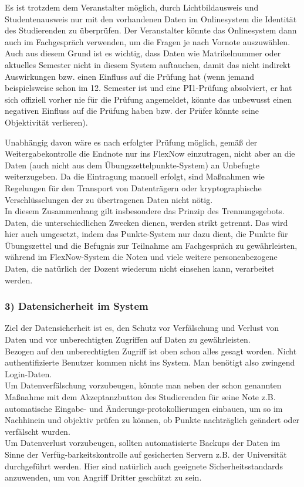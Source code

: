 \documentclass{swp1}
\begin{document}
Es ist trotzdem dem Veranstalter möglich, durch Lichtbildausweis und Studentenausweis nur mit den vorhandenen Daten im Onlinesystem die Identität des Studierenden zu überprüfen. Der Veranstalter könnte das Onlinesystem dann auch im Fachgespräch verwenden, um die Fragen je nach Vornote auszuwählen. Auch aus diesem Grund ist es wichtig, dass Daten wie Matrikelnummer oder aktuelles Semester nicht in diesem System auftauchen, damit das nicht indirekt Auswirkungen bzw. einen Einfluss auf die Prüfung hat (wenn jemand beispielsweise schon im 12. Semester ist und eine PI1-Prüfung absolviert, er hat sich offiziell vorher nie für die Prüfung angemeldet, könnte das unbewusst einen negativen Einfluss auf die Prüfung haben bzw. der Prüfer könnte seine Objektivität verlieren).

Unabhängig davon wäre es nach erfolgter Prüfung möglich, gemäß der Weitergabekontrolle die Endnote nur ins FlexNow einzutragen, nicht aber an die Daten (auch nicht aus dem Übungszettelpunkte-System) an Unbefugte weiterzugeben. Da die Eintragung manuell erfolgt, sind Maßnahmen wie Regelungen für den Transport von Datenträgern oder 
kryptographische Verschlüsselungen der zu übertragenen Daten nicht nötig. \\
In diesem Zusammenhang gilt insbesondere das Prinzip des Trennungsgebots. Daten, die unterschiedlichen Zwecken dienen, werden strikt getrennt. Das wird hier auch umgesetzt, indem das Punkte-System nur dazu dient, die Punkte für Übungszettel und die Befugnis zur Teilnahme am Fachgespräch zu gewährleisten, während im FlexNow-System die Noten und viele weitere personenbezogene Daten, die natürlich der Dozent wiederum nicht einsehen kann, verarbeitet werden.


\subsubsection*{3) Datensicherheit im System}

Ziel der Datensicherheit ist es, den Schutz vor Verfälschung und Verlust von Daten und vor unberechtigten Zugriffen auf Daten zu gewährleisten.\\
Bezogen auf den unberechtigten Zugriff ist oben schon alles gesagt worden. Nicht authentifizierte Benutzer kommen nicht ins System. Man benötigt also zwingend Login-Daten. \\
Um Datenverfälschung vorzubeugen, könnte man neben der schon genannten Maßnahme mit dem Akzeptanzbutton des Studierenden für seine Note z.B. automatische Eingabe- und Änderungs-protokollierungen einbauen, um so im Nachhinein und objektiv prüfen zu können, ob Punkte nachträglich geändert oder verfälscht wurden.\\
Um Datenverlust vorzubeugen, sollten automatisierte Backups der Daten im Sinne der Verfüg-barkeitskontrolle auf gesicherten Servern z.B. der Universität durchgeführt werden. Hier sind natürlich auch geeignete Sicherheitsstandards anzuwenden, um von Angriff Dritter geschützt zu sein.
\end{document}
